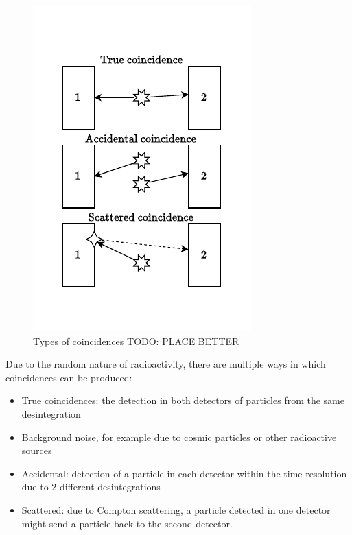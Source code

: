 \begin{figure}
    \includegraphics[width=\linewidth, trim={0 1cm 0 1.2cm}, clip]{figures/coincidence_types.pdf}
    \caption{Types of coincidences TODO: PLACE BETTER}
\end{figure}
Due to the random nature of radioactivity, there are multiple ways in which coincidences can be produced:
\begin{itemize}
    \item True coincidences: the detection in both detectors of particles from the same desintegration
    \item Background noise, for example due to cosmic particles or other radioactive sources
    \item Accidental: detection of a particle in each detector within the time resolution due to 2 different desintegrations
    \item Scattered: due to Compton scattering, a particle detected in one detector might send a particle back to the second detector.
\end{itemize}

